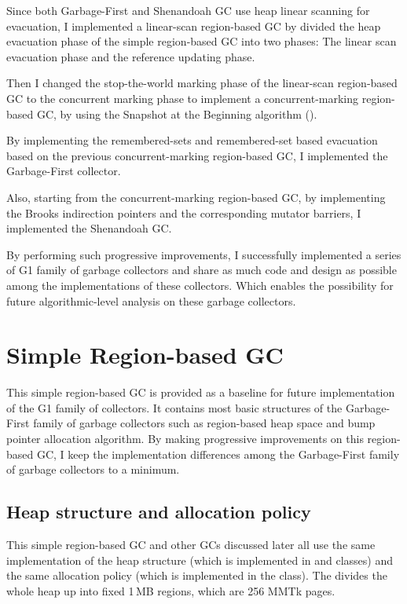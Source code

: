 Since both Garbage-First and Shenandoah GC use heap linear scanning for evacuation,
I implemented a linear-scan region-based GC by divided the heap evacuation phase
of the simple region-based GC into two phases: The linear scan evacuation phase
and the reference updating phase.

Then I changed the stop-the-world marking phase of the linear-scan region-based GC
to the concurrent marking phase to implement a concurrent-marking region-based GC, 
by using the Snapshot at the Beginning algorithm (\cite{yuasa1990real}).

By implementing the remembered-sets and remembered-set based evacuation based on
the previous concurrent-marking region-based GC, I implemented the Garbage-First collector.

Also, starting from the concurrent-marking region-based GC, by implementing the Brooks indirection pointers
and the corresponding mutator barriers, I implemented the Shenandoah GC.

By performing such progressive improvements, I successfully implemented a series of
G1 family of garbage collectors and share as much code and design as possible
among the implementations of these collectors. Which enables the possibility for future
algorithmic-level analysis on these garbage collectors.

\section{Simple Region-based GC}
\label{sec:simpleregiongc}

This simple region-based GC is provided as a baseline for future implementation of the G1 family of collectors.
It contains most basic structures of the Garbage-First family of garbage collectors such as
region-based heap space and bump pointer allocation algorithm. By making progressive improvements
on this region-based GC, I keep the implementation differences among the
Garbage-First family of garbage collectors to a minimum.

\subsection{Heap structure and allocation policy}

This simple region-based GC and other GCs discussed later all use the same implementation of the
heap structure (which is implemented in  and  classes) and the
same allocation policy (which is implemented in the  class).
The  divides the whole heap up into fixed 1\,MB regions, which
are 256 MMTk pages.

